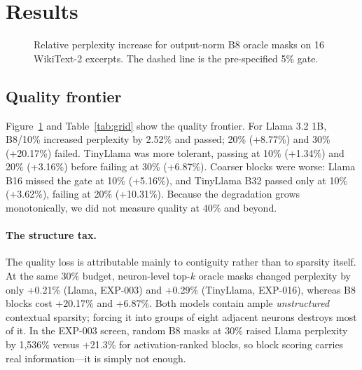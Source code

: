 \section{Results}

\begin{table}[t]
\centering
\caption{Full measured B8 grid. $\Delta$PPL is relative perplexity increase
over dense (\%; \checkmark\ passes the 5\% gate). Speedups (\%) are the mean of
three per-run medians with [min, max] across runs; negative values mean the
sparse executor is slower. Both executors run identical block-aligned masks
with random FP32 weights in each model's FFN shape (EXP-012, EXP-018); the
real-mask Llama replay is reported in Section~\ref{sec:runtime}. ``--'' marks
conditions that were not measured.}
\label{tab:grid}
\footnotesize
\setlength{\tabcolsep}{3.5pt}

\end{table}

\begin{figure}[t]
\centering

\caption{Relative perplexity increase for output-norm B8 oracle masks on 16
WikiText-2 excerpts. The dashed line is the pre-specified 5\% gate.}
\label{fig:quality}
\end{figure}

\subsection{Quality frontier}
\label{sec:quality}

Figure~\ref{fig:quality} and Table~\ref{tab:grid} show the quality frontier.
For Llama 3.2 1B, B8/10\% increased perplexity by 2.52\% and passed; 20\%
(+8.77\%) and 30\% (+20.17\%) failed. TinyLlama was more tolerant, passing at
10\% (+1.34\%) and 20\% (+3.16\%) before failing at 30\% (+6.87\%). Coarser
blocks were worse: Llama B16 missed the gate at 10\% (+5.16\%), and TinyLlama
B32 passed only at 10\% (+3.62\%), failing at 20\% (+10.31\%). Because the
degradation grows monotonically, we did not measure quality at 40\% and
beyond.

\paragraph{The structure tax.} The quality loss is attributable mainly to
contiguity rather than to sparsity itself. At the same 30\% budget, neuron-level
top-$k$ oracle masks changed perplexity by only +0.21\% (Llama, EXP-003) and
+0.29\% (TinyLlama, EXP-016), whereas B8 blocks cost +20.17\% and +6.87\%.
Both models contain ample \emph{unstructured} contextual sparsity; forcing it
into groups of eight adjacent neurons destroys most of it. In the EXP-003
screen, random B8 masks at 30\% raised Llama perplexity by 1,536\% versus
+21.3\% for activation-ranked blocks, so block scoring carries real
information---it is simply not enough.

